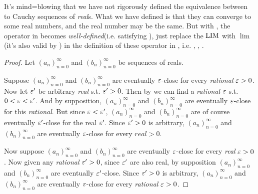 \begin{note}
It's mind=blowing that we have not rigorously defined the equivalence between to Cauchy sequences of \emph{real}s.
What we have defined is that they can converge to some real numbers, and the real number may be the same.
But with , the operator in  becomes \emph{well-defined}(i.e. satisfying ), just replace the \(\text{LIM}\) with \(\lim\) (it's also valid by ) in the definition of these operator in , i.e. , , .
\end{note}

\begin{proof}
Let \((a_n)_{n = 0}^{\infty}\) and \((b_n)_{n = 0}^{\infty}\) be sequences of reals.

Suppose \((a_n)_{n = 0}^{\infty}\) and \((b_n)_{n = 0}^{\infty}\) are eventually \(\varepsilon\)-close for every \emph{rational} \(\varepsilon > 0\).
Now let \(\varepsilon'\) be arbitrary \emph{real} s.t. \(\varepsilon' > 0\).
Then by  we can find a \emph{rational} \(\varepsilon\) s.t. \(0 < \varepsilon < \varepsilon'\).
And by supposition, \((a_n)_{n = 0}^{\infty}\) and \((b_n)_{n = 0}^{\infty}\) are eventually \(\varepsilon\)-close for this \emph{rational}.
But since \(\varepsilon < \varepsilon'\), \((a_n)_{n = 0}^{\infty}\) and \((b_n)_{n = 0}^{\infty}\) are of course eventually \(\varepsilon'\)-close for the real \(\varepsilon'\).
Since \(\varepsilon' > 0\) is arbitrary, \((a_n)_{n = 0}^{\infty}\) and \((b_n)_{n = 0}^{\infty}\) are eventually \(\varepsilon\)-close for every \(real > 0\).

Now suppose \((a_n)_{n = 0}^{\infty}\) and \((b_n)_{n = 0}^{\infty}\) are eventually \(\varepsilon\)-close for every \emph{real} \(\varepsilon > 0\).
Now given any \emph{rational} \(\varepsilon' > 0\), since \(\varepsilon'\) are also real, by supposition \((a_n)_{n = 0}^{\infty}\) and \((b_n)_{n = 0}^{\infty}\) are eventually \(\varepsilon'\)-close.
Since \(\varepsilon' > 0\) is arbitrary, \((a_n)_{n = 0}^{\infty}\) and \((b_n)_{n = 0}^{\infty}\) are eventually \(\varepsilon\)-close for every \emph{rational} \(\varepsilon > 0\).
\end{proof}